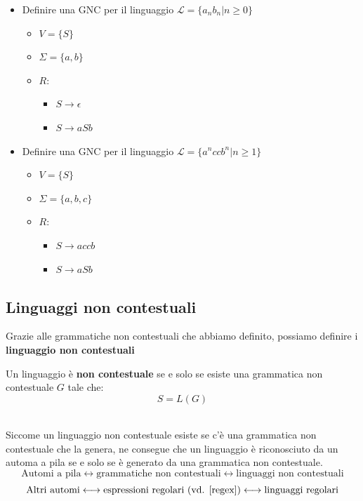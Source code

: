\begin{itemize}
    \item Definire una GNC per il linguaggio $\mathcal{L} = \{  a_n b_n | n\ge 0  \}$
    \begin{itemize}
        \item $V = \{ S  \}$
        \item $\Sigma = \{  a,b\}$
        \item $R$:
        \begin{itemize}[label =  ]
            \item $S\to \epsilon$
            \item $S \to aSb$
        \end{itemize}
    \end{itemize}

\item Definire una GNC per il linguaggio $\mathcal{L} = \{ a^n cc b^n | n\ge 1    \}$
\begin{itemize}
        \item $V = \{ S  \}$
        \item $\Sigma = \{  a,b,c\}$
        \item $R$:
        \begin{itemize}[label =  ]
            \item $S\to accb$
            \item $S \to aSb$
        \end{itemize}
    \end{itemize}
\end{itemize}


\subsection{Linguaggi non contestuali}
Grazie alle grammatiche non contestuali che abbiamo definito, possiamo definire i \textbf{linguaggio non contestuali}\smallskip\\
\colorbox{SALZO}{\parbox{\dimexpr\linewidth-2\fboxsep}{\begin{theorem}
   Un linguaggio è \textbf{non contestuale} se e solo se esiste una grammatica non contestuale $G$ tale che:
   \[   S = L(G)  \]
\end{theorem}}}\smallskip\\
Siccome un linguaggio non contestuale esiste se c'è una grammatica non contestuale che la genera, ne consegue che un linguaggio è 
riconosciuto da un automa a pila se e solo se è generato da una grammatica non contestuale. 
\[    \text{Automi a pila} \longleftrightarrow \text{grammatiche non contestuali} \longleftrightarrow \text{linguaggi non contestuali}   \]
\[    \text{Altri automi} \longleftrightarrow \text{espressioni regolari (vd. \ref{regex})} \longleftrightarrow \text{linguaggi regolari}   \]


